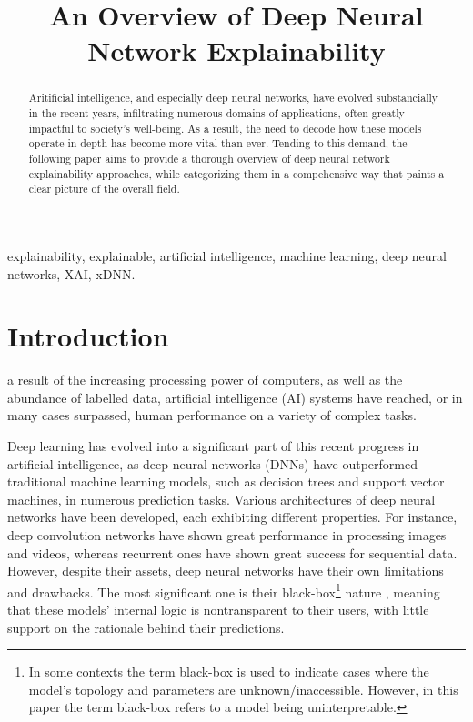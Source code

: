 \documentclass[journal]{IEEEtran}
\begin{document}

\title{An Overview of Deep Neural \\Network Explainability}

\author{}

\maketitle


\begin{abstract}
Aritificial intelligence, and especially deep neural networks, have evolved substancially in the recent years, infiltrating numerous domains of applications, often greatly impactful to society's well-being. As a result, the need to decode how these models operate in depth has become more vital than ever. Tending to this demand, the following paper aims to provide a thorough overview of deep neural network explainability approaches, while categorizing them in a compehensive way that paints a clear picture of the overall field.
\end{abstract}

\begin{IEEEkeywords}
explainability, explainable, artificial intelligence, machine learning, deep neural networks, XAI, xDNN.
\end{IEEEkeywords}


\IEEEpeerreviewmaketitle


\section{Introduction}

 a result of the increasing processing power of computers, as well as the abundance of labelled data, artificial intelligence (AI) systems have reached, or in many cases surpassed, human performance on a variety of complex tasks.

Deep learning has evolved into a significant part of this recent progress in artificial intelligence, as deep neural networks (DNNs) have outperformed traditional machine learning models, such as decision trees and support vector machines, in numerous prediction tasks. Various architectures of deep neural networks have been developed, each exhibiting different properties. For instance, deep convolution networks have shown great performance in processing images and videos, whereas recurrent ones have shown great success for sequential data.
However, despite their assets, deep neural networks have their own limitations and drawbacks. The most significant one is their black-box\footnote{In some contexts the term black-box is used to indicate cases where the model's topology and parameters are unknown/inaccessible. However, in this paper the term black-box refers to a model being uninterpretable.} nature \cite{Du2018}, meaning that these models’ internal logic is nontransparent to their users, with little support on the rationale behind their predictions.
\end{document}
